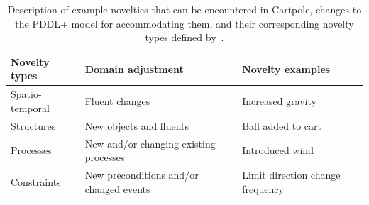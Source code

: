 \documentclass{article}
\begin{document}
\begin{table}[tbh!]
	\centering
	\footnotesize
	\begin{tabular}{p{} | p{} | p{}}
		\hline
		\textbf{Novelty types} & \textbf{Domain adjustment} & \textbf{Novelty examples} \\
		\hline
		Spatio-temporal  & Fluent changes & Increased gravity \\
		Structures  & New objects and fluents & Ball added to cart \\
		Processes  & New and/or changing existing processes & Introduced wind \\
		Constraints & New preconditions and/or changed events & Limit direction change frequency \\
		
		\hline
	\end{tabular}
	\caption{Description of example novelties that can be encountered in Cartpole, changes to the PDDL+ model for accommodating them, and their corresponding novelty types defined by~\protect\cite{langley2020open}.} %
\label{tab:novelties_pddl}
\end{table}
\vspace{-0.3cm}
\end{document}
